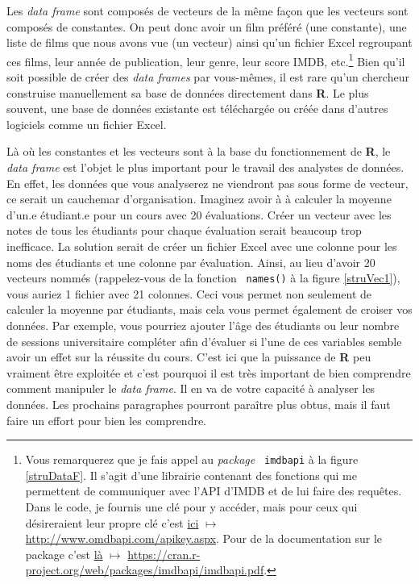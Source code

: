 \documentclass[10.5pt,a4paper]{article}
\newcommand{\rcode}[1]{\texttt{\color{rstudio} #1}}
\begin{document}
    Les \emph{data frame} sont composés de vecteurs de la même façon que les vecteurs sont composés de constantes. On peut donc avoir un film préféré (une constante), une liste de films que nous avons vue (un vecteur) ainsi qu'un fichier Excel regroupant ces films, leur année de publication, leur genre, leur score IMDB, etc.\footnote{Vous remarquerez que je fais appel au \emph{package} \rcode{imdbapi} à la figure \ref{struDataF}. Il s'agit d'une librairie contenant des fonctions qui me permettent de communiquer avec l'API d'IMDB et de lui faire des requêtes. Dans le code, je fournis une clé pour y accéder, mais pour ceux qui désireraient leur propre clé c'est \href{http://www.omdbapi.com/apikey.aspx}{ici} $\mapsto$ \href{http://www.omdbapi.com/apikey.aspx}{http://www.omdbapi.com/apikey.aspx}. Pour de la documentation sur le package c'est \href{https://cran.r-project.org/web/packages/imdbapi/imdbapi.pdf}{là} $\mapsto$ \href{https://cran.r-project.org/web/packages/imdbapi/imdbapi.pdf}{https://cran.r-project.org/web/packages/imdbapi/imdbapi.pdf}.} Bien qu'il soit possible de créer des \emph{data frames} par vous-mêmes, il est rare qu'un chercheur construise manuellement sa base de données directement dans \textbf{R}. Le plus souvent, une base de données existante est téléchargée ou créée dans d'autres logiciels comme un fichier Excel. 
    
    Là où les constantes et les vecteurs sont à la base du fonctionnement de \textbf{R}, le \emph{data frame} est l'objet le plus important pour le travail des analystes de données. En effet, les données que vous analyserez ne viendront pas sous forme de vecteur, ce serait un cauchemar d'organisation. Imaginez avoir à à calculer la moyenne d'un.e étudiant.e pour un cours avec 20 évaluations. Créer un vecteur avec les notes de tous les étudiants pour chaque évaluation serait beaucoup trop inefficace. La solution serait de créer un fichier Excel avec une colonne pour les noms des étudiants et une colonne par évaluation. Ainsi, au lieu d'avoir 20 vecteurs nommés (rappelez-vous de la fonction \rcode{names()} à la figure \ref{struVec1}), vous auriez 1 fichier avec 21 colonnes. Ceci vous permet non seulement de calculer la moyenne par étudiants, mais cela vous permet également de croiser vos données. Par exemple, vous pourriez ajouter l'âge des étudiants ou leur nombre de sessions universitaire compléter afin d'évaluer si l'une de ces variables semble avoir un effet sur la réussite du cours. C'est ici que la puissance de \textbf{R} peu vraiment être exploitée et c'est pourquoi il est très important de bien comprendre comment manipuler le \emph{data frame}. Il en va de votre capacité à analyser les données. Les prochains paragraphes pourront paraître plus obtus, mais il faut faire un effort pour bien les comprendre. 
    
\end{document}
